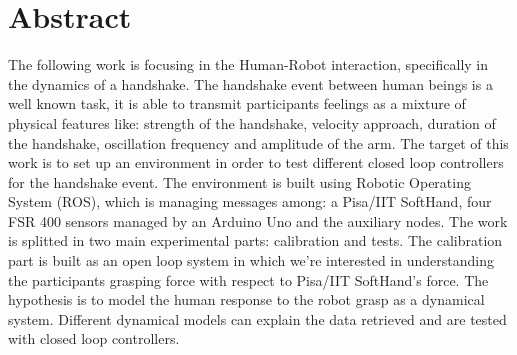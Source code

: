 
\chapter*{Abstract}
\begin{center}

\end{center}
\vspace{60px}
The following work is focusing in the Human-Robot interaction, specifically in the dynamics of a handshake. The handshake event between human beings is a well known task, it is able to transmit participants feelings as a mixture of physical features like: strength of the handshake, velocity approach, duration of the handshake, oscillation frequency and amplitude of the arm.
The target of this work is to set up an environment in order to test different closed loop controllers for the handshake event.
The environment is built using Robotic Operating System (ROS), which is managing messages among: a Pisa/IIT SoftHand, four FSR 400 sensors managed by an Arduino Uno and the auxiliary nodes.
The work is splitted in two main experimental parts: calibration and tests. The calibration part is built as an open loop system in which we're interested in understanding the participants grasping force with respect to Pisa/IIT SoftHand's force. The hypothesis is to model the human response to the robot grasp as a dynamical system. Different dynamical models can explain the data retrieved and are tested with closed loop controllers.
\\

